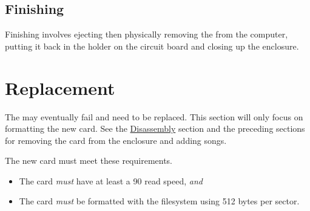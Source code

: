 \subsection{Finishing}

Finishing involves ejecting then physically removing the  from the
computer, putting it back in the holder on the circuit board and closing up the
enclosure.


\pagebreak
\section{Replacement} \label{Replace SD Card}

The  may eventually fail and need to be replaced.  This section will
only focus on formatting the new card.  See the
\hyperref[Disassembly]{Disassembly} section and the preceding sections for
removing the card from the enclosure and adding songs.

\par\medskip

The new card must meet these requirements.

\begin{itemize}
  \item The card \textit{must} have at least a \num{90}  read
    speed, \textit{and}
  \item The card \textit{must} be formatted with the  filesystem
    using \num{512} bytes per sector.
\end{itemize}

